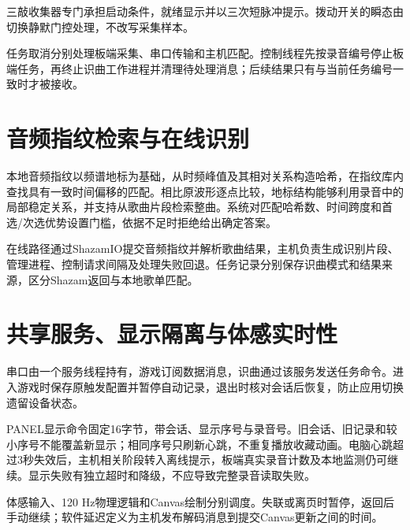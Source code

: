 三敲收集器专门承担启动条件，就绪显示并以三次短脉冲提示。拨动开关的瞬态由切换静默门控处理，不改写采集样本。

任务取消分别处理板端采集、串口传输和主机匹配。控制线程先按录音编号停止板端任务，再终止识曲工作进程并清理待处理消息；后续结果只有与当前任务编号一致时才被接收。

\section{音频指纹检索与在线识别}
本地音频指纹以频谱地标为基础，从时频峰值及其相对关系构造哈希，在指纹库内查找具有一致时间偏移的匹配\cite{audfprint}。相比原波形逐点比较，地标结构能够利用录音中的局部稳定关系，并支持从歌曲片段检索整曲。系统对匹配哈希数、时间跨度和首选/次选优势设置门槛，依据不足时拒绝给出确定答案。

在线路径通过ShazamIO提交音频指纹并解析歌曲结果\cite{shazamio}，主机负责生成识别片段、管理进程、控制请求间隔及处理失败回退。任务记录分别保存识曲模式和结果来源，区分Shazam返回与本地歌单匹配。


\section{共享服务、显示隔离与体感实时性}
串口由一个服务线程持有，游戏订阅数据消息，识曲通过该服务发送任务命令。进入游戏时保存原触发配置并暂停自动记录，退出时核对会话后恢复，防止应用切换遗留设备状态。

PANEL显示命令固定16字节，带会话、显示序号与录音号。旧会话、旧记录和较小序号不能覆盖新显示；相同序号只刷新心跳，不重复播放收藏动画。电脑心跳超过3秒失效后，主机相关阶段转入离线提示，板端真实录音计数及本地监测仍可继续。显示失败有独立超时和降级，不应导致完整录音读取失败。

体感输入、120 Hz物理逻辑和Canvas绘制分别调度。失联或离页时暂停，返回后手动继续；软件延迟定义为主机发布解码消息到提交Canvas更新之间的时间。
